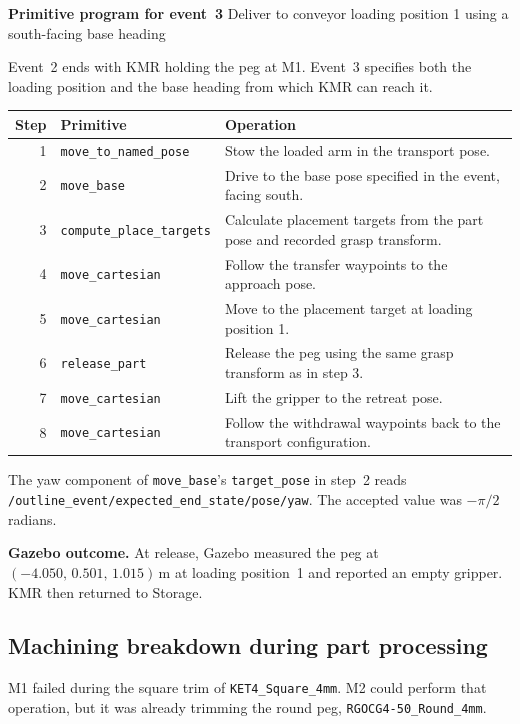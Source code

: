 \documentclass[preprint,12pt,authoryear]{elsarticle}
\let\code\nolinkurl
\begin{document}
\textbf{Primitive program for event~3} \enspace Deliver to conveyor loading position 1 using a south-facing base heading\par
Event~2 ends with KMR holding the peg at M1. Event~3 specifies both the loading position and the base heading from which KMR can reach it.

{\small
\begin{tabularx}{\linewidth}{@{}r l Y@{}}
\toprule
Step & Primitive & Operation \\
 & \code{move_to_named_pose} & Stow the loaded arm in the transport pose. \\
2 & \code{move_base} & Drive to the base pose specified in the event, facing south. \\
3 & \code{compute_place_targets} & Calculate placement targets from the part pose and recorded grasp transform. \\
4 & \code{move_cartesian} & Follow the transfer waypoints to the approach pose. \\
5 & \code{move_cartesian} & Move to the placement target at loading position 1. \\
6 & \code{release_part} & Release the peg using the same grasp transform as in step 3. \\
7 & \code{move_cartesian} & Lift the gripper to the retreat pose. \\
8 & \code{move_cartesian} & Follow the withdrawal waypoints back to the transport configuration. \\
\bottomrule
\end{tabularx}\par}
The yaw component of \code{move_base}'s \code{target_pose} in step~2 reads \code{/outline_event/expected_end_state/pose/yaw}. The accepted value was $-\pi/2$ radians.

\smallskip
\textbf{Gazebo outcome.} At release, Gazebo measured the peg at $(-4.050,\,0.501,\,1.015)$\,m at loading position~1 and reported an empty gripper. KMR then returned to Storage.

\clearpage
\subsection{Machining breakdown during part processing}
M1 failed during the square trim of \code{KET4_Square_4mm}. M2 could perform that operation, but it was already trimming the round peg, \code{RGOCG4-50_Round_4mm}.
\end{document}
